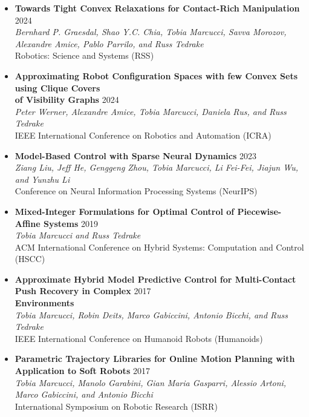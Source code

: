 \documentclass[11pt,a4paper,sans]{moderncv}
\begin{document}
\begin{itemize}
\item \textbf{Towards Tight Convex Relaxations for Contact-Rich Manipulation} \hfill 2024 \\
\textit{Bernhard P. Graesdal, Shao Y.C. Chia, Tobia Marcucci, Savva Morozov, Alexandre Amice, Pablo Parrilo, and Russ Tedrake} \\
Robotics: Science and Systems (RSS)

\item \textbf{Approximating Robot Configuration Spaces with few Convex Sets using Clique Covers \\ of Visibility Graphs} \hfill 2024 \\
\textit{Peter Werner, Alexandre Amice, Tobia Marcucci, Daniela Rus, and Russ Tedrake} \\
IEEE International Conference on Robotics and Automation (ICRA)


\item \textbf{Model-Based Control with Sparse Neural Dynamics} \hfill 2023 \\
\textit{Ziang Liu, Jeff He, Genggeng Zhou, Tobia Marcucci, Li Fei-Fei, Jiajun Wu, and Yunzhu Li} \\
Conference on Neural Information Processing Systems (NeurIPS)

\item \textbf{Mixed-Integer Formulations for Optimal Control of Piecewise-Affine Systems} \hfill 2019 \\
\textit{Tobia Marcucci and Russ Tedrake} \\
ACM International Conference on Hybrid Systems: Computation and Control (HSCC)

\item \textbf{Approximate Hybrid Model Predictive Control for Multi-Contact Push Recovery in Complex} \hfill 2017 \\
\textbf{Environments} \\
\textit{Tobia Marcucci, Robin Deits, Marco Gabiccini, Antonio Bicchi, and Russ Tedrake} \\
IEEE International Conference on Humanoid Robots (Humanoids)

\item \textbf{Parametric Trajectory Libraries for Online Motion Planning with Application to Soft Robots} \hfill 2017 \\
\textit{Tobia Marcucci, Manolo Garabini, Gian Maria Gasparri, Alessio Artoni, Marco Gabiccini, and Antonio Bicchi} \\
International Symposium on Robotic Research (ISRR)


\end{itemize}
\end{document}
